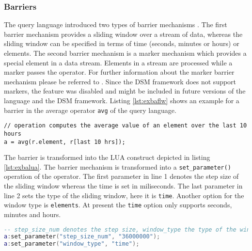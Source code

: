 \subsubsection{Barriers}
The query language introduced two types of barrier mechanisms 
\cite{297:Frey2010}. The first barrier mechanism provides a sliding window over
a stream of data, whereas the sliding window can be specified in terms of time
(seconds, minutes or hours) or elements. The second barrier mechanism is a 
marker mechanism which provides a special element in a data stream. Elements 
in a stream are processed while a marker passes the operator. For further 
information about the marker barrier mechanism please be referred to 
\cite{297:Frey2010}. Since the DSM framework does not support markers, the 
feature was disabled and might be included in future versions of the language 
and the DSM framework. Listing \ref{lst:exbaflw} shows an example for a barrier
in the average operator \texttt{avg} of the query language.
\begin{lstlisting}[language=Flow, caption={\emph{Example of Barrier Mechanism in Flow}},label={lst:exbaflw}]
// operation computes the average value of an element over the last 10 hours
a = avg(r.element, r[last 10 hrs]);
\end{lstlisting}
The barrier is transformed into the LUA construct depicted in listing 
\ref{lst:exbalua}. The barrier mechanism is transformed into a 
\texttt{set\_parameter()} operation of the operator. The first parameter in line
1 denotes the step size of the sliding window whereas the time is set in 
miliseconds. The last parameter in line 2 sets the type of the sliding window,
here it is \texttt{time}. Another option for the window type is 
\texttt{elements}. At present the \texttt{time} option only supports seconds,
minutes and hours. 
\begin{lstlisting}[language=Lua, caption={\emph{Example of Barrier Mechanism in LUA}},label={lst:exbalua}]
-- step_size_num denotes the step size, window_type the type of the window
a:set_parameter("step_size_num", "36000000");
a:set_parameter("window_type", "time");
\end{lstlisting}

